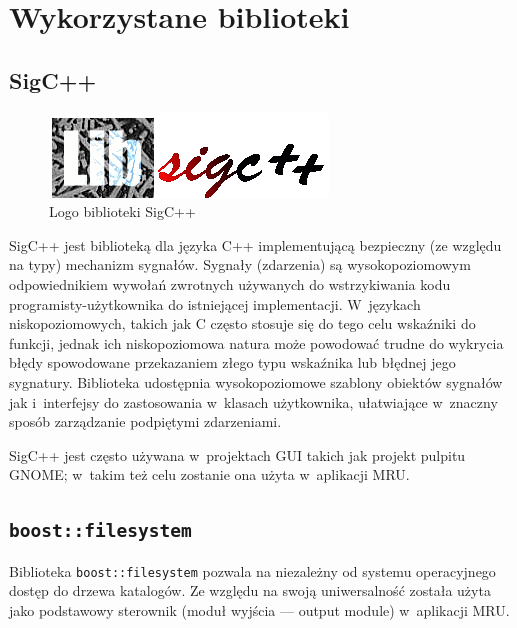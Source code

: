 
\section{Wykorzystane biblioteki}
\label{wykorzystane-biblioteki}

\subsection{SigC++}
\begin{figure}
\begin{center}
\includegraphics[scale=0.50]{img/sigcpp_logo.png}
\end{center}
\caption{Logo biblioteki SigC++}
\end{figure}
\par
SigC++ jest biblioteką dla języka C++ implementującą bezpieczny (ze względu na typy) mechanizm sygnałów.
Sygnały (zdarzenia) są wysokopoziomowym odpowiednikiem wywołań zwrotnych używanych do wstrzykiwania kodu programisty-użytkownika do istniejącej implementacji. W~językach niskopoziomowych, takich jak C często stosuje się do tego celu wskaźniki do funkcji, jednak ich niskopoziomowa natura może powodować trudne do wykrycia błędy spowodowane przekazaniem złego typu wskaźnika lub błędnej jego sygnatury. Biblioteka udostępnia wysokopoziomowe szablony obiektów sygnałów jak i~interfejsy do zastosowania w~klasach użytkownika, ułatwiające w~znaczny sposób zarządzanie podpiętymi zdarzeniami.\\
\par
SigC++ jest często używana w~projektach GUI takich jak projekt pulpitu GNOME; w~takim też celu zostanie ona użyta w~aplikacji MRU.

\subsection{\texttt{boost::filesystem}}
\par
Biblioteka \texttt{boost::filesystem} pozwala na niezależny od systemu operacyjnego dostęp do drzewa katalogów. Ze względu na swoją uniwersalność została użyta jako podstawowy sterownik (moduł wyjścia --- output module) w~aplikacji MRU.

